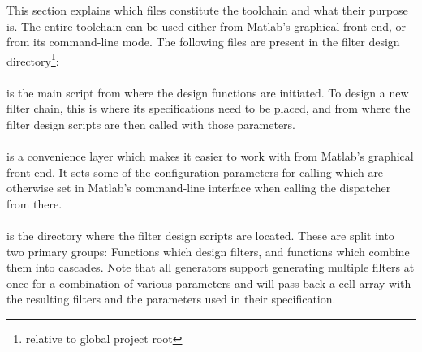 This  section explains  which files  constitute the  toolchain and  what their
purpose is. The  entire toolchain can  be used either from  Matlab's graphical
front-end, or from  its command-line mode. The following files  are present in
the filter design directory\footnote{%
    relative to global project root%
}:
\vspace{2ex}
\noindent{}

\paragraph{} is  the main  script from where  the design
functions are  initiated.  To  design a  new filter chain,  this is  where its
specifications need to be placed, and from where the filter design scripts are
then called with those parameters.

\paragraph{} is  a convenience layer which  makes it easier
to work with  from Matlab's graphical front-end. It sets
some of the configuration  parameters for calling  which
are  otherwise  set  in  Matlab's  command-line  interface  when  calling  the
dispatcher from there.

\paragraph{}  is  the  directory  where  the  filter  design
scripts are located. These are split  into two primary groups: Functions which
design filters, and functions which  combine them into cascades. Note that all
generators support  generating multiple filters  at once for a  combination of
various parameters and will pass back  a cell array with the resulting filters
and the parameters used in their specification.


